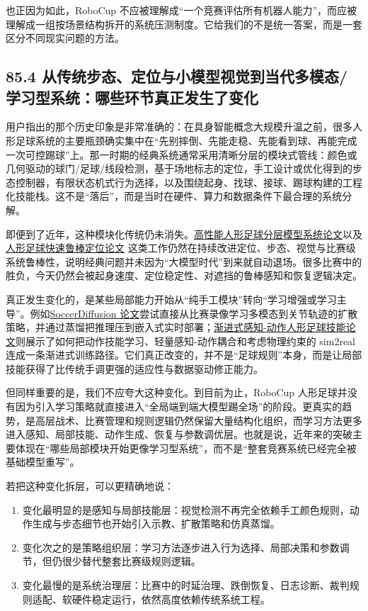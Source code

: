 也正因为如此，RoboCup 不应被理解成“一个竞赛评估所有机器人能力”，而应被理解成一组按场景结构拆开的系统压测制度。它给我们的不是统一答案，而是一套区分不同现实问题的方法。

\subsection*{85.4 从传统步态、定位与小模型视觉到当代多模态/学习型系统：哪些环节真正发生了变化}


用户指出的那个历史印象是非常准确的：在具身智能概念大规模升温之前，很多人形足球系统的主要瓶颈确实集中在“先别摔倒、先能走稳、先能看到球、再能完成一次可控踢球”上。那一时期的经典系统通常采用清晰分层的模块式管线：颜色或几何驱动的球门/足球/线段检测，基于场地标志的定位，手工设计或优化得到的步态控制器，有限状态机式行为选择，以及围绕起身、找球、接球、踢球构建的工程化技能栈。这不是“落后”，而是当时在硬件、算力和数据条件下最合理的系统分解。

即便到了近年，这种模块化传统仍未消失。\href{https://arxiv.org/abs/2512.09431}{高性能人形足球分层模型系统论文}以及\href{https://arxiv.org/abs/2503.11020}{人形足球快速鲁棒定位论文} 这类工作仍然在持续改进定位、步态、视觉与比赛级系统鲁棒性，说明经典问题并未因为“大模型时代”到来就自动退场。很多比赛中的胜负，今天仍然会被起身速度、定位稳定性、对遮挡的鲁棒感知和恢复逻辑决定。

真正发生变化的，是某些局部能力开始从“纯手工模块”转向“学习增强或学习主导”。例如\href{https://arxiv.org/abs/2504.20808}{SoccerDiffusion 论文}尝试直接从比赛录像学习多模态到关节轨迹的扩散策略，并通过蒸馏把推理压到嵌入式实时部署；\href{https://arxiv.org/abs/2602.05310}{渐进式感知-动作人形足球技能论文}则展示了如何把动作技能学习、轻量感知-动作耦合和考虑物理约束的 sim2real 连成一条渐进式训练路径。它们真正改变的，并不是“足球规则”本身，而是让局部技能获得了比传统手调更强的适应性与数据驱动修正能力。

但同样重要的是，我们不应夸大这种变化。到目前为止，RoboCup 人形足球并没有因为引入学习策略就直接进入“全局端到端大模型踢全场”的阶段。更真实的趋势，是高层战术、比赛管理和规则逻辑仍然保留大量结构化组织，而学习方法更多进入感知、局部技能、动作生成、恢复与参数调优层。也就是说，近年来的突破主要体现在“哪些局部模块开始更像学习型系统”，而不是“整套竞赛系统已经完全被基础模型重写”。

若把这种变化拆层，可以更精确地说：

\begin{enumerate}
\item 变化最明显的是感知与局部技能层：视觉检测不再完全依赖手工颜色规则，动作生成与步态细节也开始引入示教、扩散策略和仿真蒸馏。
\item 变化次之的是策略组织层：学习方法逐步进入行为选择、局部决策和参数调节，但仍很少替代整套比赛级规则逻辑。
\item 变化最慢的是系统治理层：比赛中的时延治理、跌倒恢复、日志诊断、裁判规则适配、软硬件稳定运行，依然高度依赖传统系统工程。
\end{enumerate}

